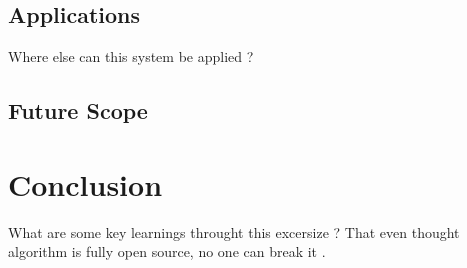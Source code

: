 \documentclass[12pt]{report}
\begin{document}
\section{Applications}
Where else can this system be applied ?
\section{Future Scope}


\chapter{Conclusion}
What are some key learnings throught this excersize ? That even thought algorithm is fully open source, no one can break it .




\end{document}
